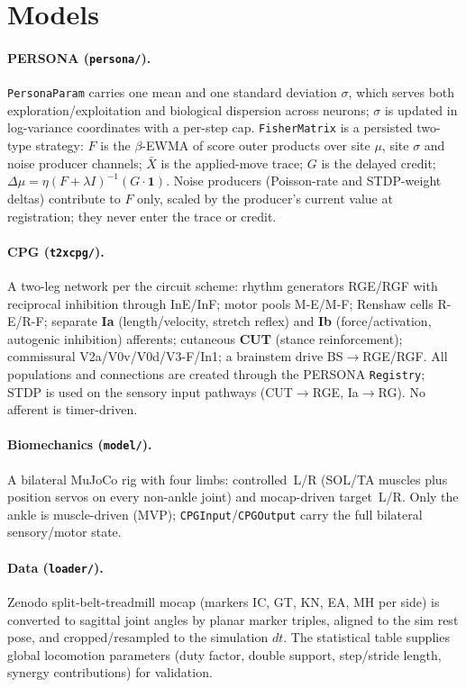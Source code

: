 \documentclass[11pt]{article}
\begin{document}
\section{Models}
\label{sec:models}

\paragraph{PERSONA (\texttt{persona/}).}
\texttt{PersonaParam} carries one mean and one standard deviation $\sigma$,
which serves both exploration/exploitation and biological dispersion across
neurons; $\sigma$ is updated in log-variance coordinates with a per-step cap.
\texttt{FisherMatrix} is a persisted two-type strategy: $F$ is the
$\beta$-EWMA of score outer products over site $\mu$, site $\sigma$ and noise
producer channels; $\bar{X}$ is the applied-move trace; $G$ is the delayed
credit; $\Delta\mu=\eta(F+\lambda I)^{-1}(G\cdot\mathbf{1})$. Noise producers
(Poisson-rate and STDP-weight deltas) contribute to $F$ only, scaled by the
producer's current value at registration; they never enter the trace or
credit.

\paragraph{CPG (\texttt{t2xcpg/}).}
A two-leg network per the circuit scheme: rhythm generators RGE/RGF with
reciprocal inhibition through InE/InF; motor pools M-E/M-F; Renshaw cells
R-E/R-F; separate \textbf{Ia} (length/velocity, stretch reflex) and
\textbf{Ib} (force/activation, autogenic inhibition) afferents; cutaneous
\textbf{CUT} (stance reinforcement); commissural V2a/V0v/V0d/V3-F/In1; a
brainstem drive BS$\rightarrow$RGE/RGF. All populations and connections are
created through the PERSONA \texttt{Registry}; STDP is used on the sensory
input pathways (CUT$\rightarrow$RGE, Ia$\rightarrow$RG). No afferent is
timer-driven.

\paragraph{Biomechanics (\texttt{model/}).}
A bilateral MuJoCo rig with four limbs: controlled~L/R (SOL/TA muscles plus
position servos on every non-ankle joint) and mocap-driven target~L/R. Only
the ankle is muscle-driven (MVP); \texttt{CPGInput}/\texttt{CPGOutput} carry
the full bilateral sensory/motor state.

\paragraph{Data (\texttt{loader/}).}
Zenodo split-belt-treadmill mocap (markers IC, GT, KN, EA, MH per side) is
converted to sagittal joint angles by planar marker triples, aligned to the
sim rest pose, and cropped/resampled to the simulation $dt$. The statistical
table supplies global locomotion parameters (duty factor, double support,
step/stride length, synergy contributions) for validation.
\end{document}
